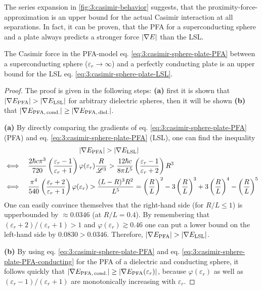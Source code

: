 The series expansion in \cref{fig:3:casimir-behavior} suggests, that the proximity-force-approximation is an upper bound for the actual Casimir interaction at all separations. In fact, it can be proven, that the PFA for a superconducting sphere and a plate always predicts a stronger force $\left\lvert\nabla E\right\rvert$ than the LSL.
\begin{theorem}
  The Casimir force in the PFA-model eq. \eqref{eq:3:casimir-sphere-plate-PFA} between a superconducting sphere ($\varepsilon_r \rightarrow \infty$) and a perfectly conducting plate is an upper bound for the LSL eq. \eqref{eq:3:casimir-sphere-plate-LSL}.
\end{theorem}
\begin{proof}
  The proof is given in the following steps: \textbf{(a)} first it is shown that $\left\lvert\nabla E_\mathrm{PFA}\right\rvert > \left\lvert\nabla E_\mathrm{LSL}\right\rvert$ for arbitrary dielectric spheres, then it will be shown \textbf{(b)} that $\left\lvert\nabla E_\mathrm{PFA,\,cond.}\right\rvert \geq \left\lvert\nabla E_\mathrm{PFA,\,diel.}\right\rvert$.

  \textbf{(a)} By directly comparing the gradients of eq. \eqref{eq:3:casimir-sphere-plate-PFA} (PFA) and eq. \eqref{eq:3:casimir-sphere-plate-PFA} (LSL),  one can find
  the inequality
  \begin{align*}
    &\qquad\qquad\qquad\qquad\qquad\ \ \left\lvert\nabla E_\mathrm{PFA}\right\rvert > \left\lvert\nabla E_\mathrm{LSL}\right\rvert \\
    &\Longleftrightarrow \quad  \frac{2\hbar c \pi^3}{720}\left(\frac{\varepsilon_r - 1}{\varepsilon_r + 1}\right)\varphi(\varepsilon_r)\frac{R}{\mathscr{L}^3} > \frac{12 \hbar c}{8\pi L^5}\left(\frac{\varepsilon_r - 1}{\varepsilon_r + 2}\right)R^3 \\
    &\Longleftrightarrow \quad \frac{\pi^4}{540}\left(\frac{\varepsilon_r + 2}{\varepsilon_r + 1}\right)\varphi(\varepsilon_r) > \frac{(L-R)^3 R^2}{L^5} = \left(\frac{R}{L}\right)^2 - 3\left(\frac{R}{L}\right)^3 + 3\left(\frac{R}{L}\right)^4 - \left(\frac{R}{L}\right)^5
  \end{align*}
  One can easily convince themselves that the right-hand side (for $R/L \leq 1$) is upperbounded by $\approx 0.0346$ (at $R/L = 0.4$). By remembering that $(\varepsilon_r + 2)/(\varepsilon_r + 1) > 1$ and $\varphi(\varepsilon_r) \gtrsim 0.46$ one can put a lower bound on the left-hand side by $0.0830 > 0.0346$. Therefore, $\left\lvert\nabla E_\mathrm{PFA}\right\rvert > \left\lvert\nabla E_\mathrm{LSL}\right\rvert$.

  \textbf{(b)} By using eq. \eqref{eq:3:casimir-sphere-plate-PFA} and eq. \eqref{eq:3:casimir-sphere-plate-PFA-conducting} for the PFA of a dielectric and conducting sphere, it follows quickly that $\left\lvert\nabla E_\mathrm{PFA,\,cond.}\right\rvert \geq \left\lvert\nabla E_\mathrm{PFA}(\varepsilon_r)\right\rvert$, because $\varphi(\varepsilon_r)$ as well as $(\varepsilon_r - 1)/(\varepsilon_r + 1)$ are monotonically increasing with $\varepsilon_r$. 


\end{proof}
